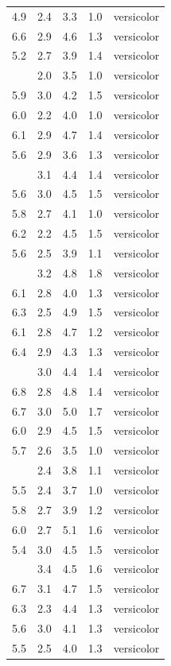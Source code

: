 \documentclass[12pt,]{krantz}
\theoremstyle{definition}
\theoremstyle{definition}
\theoremstyle{remark}
\begin{document}
\begin{longtable}[t]{rrrrl}
4.9 & 2.4 & 3.3 & 1.0 & versicolor\\
6.6 & 2.9 & 4.6 & 1.3 & versicolor\\
5.2 & 2.7 & 3.9 & 1.4 & versicolor\\
\addlinespace
5.0 & 2.0 & 3.5 & 1.0 & versicolor\\
5.9 & 3.0 & 4.2 & 1.5 & versicolor\\
6.0 & 2.2 & 4.0 & 1.0 & versicolor\\
6.1 & 2.9 & 4.7 & 1.4 & versicolor\\
5.6 & 2.9 & 3.6 & 1.3 & versicolor\\
\addlinespace
6.7 & 3.1 & 4.4 & 1.4 & versicolor\\
5.6 & 3.0 & 4.5 & 1.5 & versicolor\\
5.8 & 2.7 & 4.1 & 1.0 & versicolor\\
6.2 & 2.2 & 4.5 & 1.5 & versicolor\\
5.6 & 2.5 & 3.9 & 1.1 & versicolor\\
\addlinespace
5.9 & 3.2 & 4.8 & 1.8 & versicolor\\
6.1 & 2.8 & 4.0 & 1.3 & versicolor\\
6.3 & 2.5 & 4.9 & 1.5 & versicolor\\
6.1 & 2.8 & 4.7 & 1.2 & versicolor\\
6.4 & 2.9 & 4.3 & 1.3 & versicolor\\
\addlinespace
6.6 & 3.0 & 4.4 & 1.4 & versicolor\\
6.8 & 2.8 & 4.8 & 1.4 & versicolor\\
6.7 & 3.0 & 5.0 & 1.7 & versicolor\\
6.0 & 2.9 & 4.5 & 1.5 & versicolor\\
5.7 & 2.6 & 3.5 & 1.0 & versicolor\\
\addlinespace
5.5 & 2.4 & 3.8 & 1.1 & versicolor\\
5.5 & 2.4 & 3.7 & 1.0 & versicolor\\
5.8 & 2.7 & 3.9 & 1.2 & versicolor\\
6.0 & 2.7 & 5.1 & 1.6 & versicolor\\
5.4 & 3.0 & 4.5 & 1.5 & versicolor\\
\addlinespace
6.0 & 3.4 & 4.5 & 1.6 & versicolor\\
6.7 & 3.1 & 4.7 & 1.5 & versicolor\\
6.3 & 2.3 & 4.4 & 1.3 & versicolor\\
5.6 & 3.0 & 4.1 & 1.3 & versicolor\\
5.5 & 2.5 & 4.0 & 1.3 & versicolor\\

\end{longtable}
\end{document}

